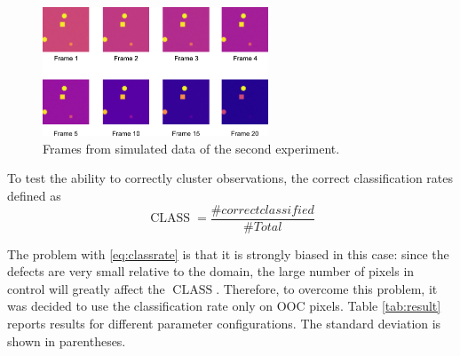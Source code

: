 \begin{figure}
    \centering
    \includegraphics[width = 0.6\textwidth]{Images/frames.png}
    \caption[Frames of simulated data.]{Frames from simulated data of the second experiment.}
    \label{fig:frames}
\end{figure}
To test the ability to correctly cluster observations, the correct classification rates defined as
\begin{equation}
    \label{eq:classrate}
    \operatorname{CLASS} = \frac{\# correct classified}{\# Total}
\end{equation}

The problem with \ref{eq:classrate} is that it is strongly biased in this case: since the defects are very small relative to the domain, the large number of pixels in control will greatly affect the $\operatorname{CLASS}$.
Therefore, to overcome this problem, it was decided to use the classification rate only on OOC pixels.
Table \ref{tab:result} reports results for different parameter configurations. The standard deviation is shown in parentheses.


